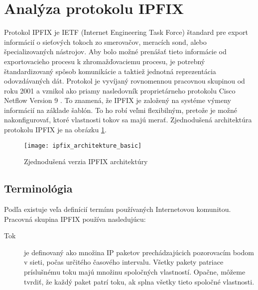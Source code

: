 \section{Anal\'yza protokolu IPFIX}

Protokol IPFIX \citep{rfc5101, ipfixProtocol, juvhaugen, veri} je IETF (Internet Engineering Task Force)
štandard pre export informácií o sieťových tokoch zo smerovačov, meracích sond, 
alebo špecializovaných nástrojov. 
Aby bolo možné prenášať tieto informácie 
od exportovacieho procesu k zhromažďovaciemu procesu, je potrebný štandardizovaný 
spôsob komunikácie a taktiež jednotná reprezentácia odovzdávaných dát.
Protokol je vyvíjaný rovnomennou pracovnou skupinou \citep{ipfixCharter} od roku 2001 a 
vznikol ako priamy nasledovník proprietárneho protokolu Cisco Netflow Version 9 \citep{rfc3954}. 
To znamená, že IPFIX je založený na systéme výmeny informácií na základe šablón. To ho robí veľmi
flexibilným, pretože je možné nakonfigurovať, ktoré vlastnosti tokov sa majú merať.
Zjednodušená architektúra protokolu IPFIX je na obrázku \ref{o:ipfix_architekture_basic}.

\begin{figure}[ht!]
\centering
\texttt{[image: ipfix\_architekture\_basic]}
\caption{Zjednodušená verzia IPFIX architektúry}\label{o:ipfix_architekture_basic}
\end{figure}

\subsection{Terminológia} \label{sec:ipfix_terminology}

Podľa \citep{rfc3917} existuje veľa definícií termínu  používaných Internetovou komunitou.
Pracovná skupina IPFIX používa nasledujúcu:
\begin{description}
  \item[Tok] je definovaný ako množina IP paketov prechádzajúcich pozorovacím bodom v sieti, počas určitého 
časového intervalu. Všetky pakety patriace príslušnému toku majú množinu spoločných vlastností. Opačne, 
môžeme tvrdiť, že každý paket patrí toku, ak splna všetky tieto spoločné vlastnosti. 
\end{description}

